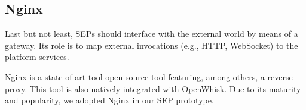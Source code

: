 

\subsection{Nginx}\label{sec:prototype_Nginx}

Last but not least, SEPs should interface with the external world by means of a gateway. Its role is to map external invocations (e.g., HTTP, WebSocket) to the platform services. %

Nginx is a state-of-art tool open source tool featuring, among others, a reverse proxy. This tool is also natively integrated with OpenWhisk. 
Due to its maturity and popularity, we adopted Nginx in our SEP prototype.


